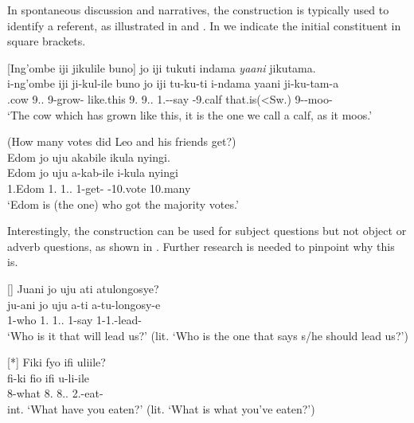 \documentclass[output=paper]{langscibook}
\begin{document}
In spontaneous discussion and narratives, the construction is typically used to identify a referent, as illustrated in  and . In  we indicate the initial constituent in square brackets.

\ea
\label{bkm:Ref123833612}
[Ing’ombe iji jikulile buno] jo iji tukuti indama \textit{yaani} jikutama.\\
\gll
i-ng’ombe  iji  ji-kul-ile  buno  jo  iji  tu-ku-ti i-ndama  yaani  ji-ku-tam-a\\
.cow  9.\DEM.\PROX{}  9\SM{}-grow-\PFV{}  like.this  9.\PRO{}  9.\DEM.\PROX{}  1\PL.\SM-\PRS{}-say \AUG{}-9.calf  that.is(<Sw.)  9\SM-\PRS{}-moo-\FV{}\\
\glt ‘The cow which has grown like this, it is the one we call a calf, as it moos.’

\ex
\label{bkm:Ref123834425}
(How many votes did Leo and his friends get?)\\
Edom jo uju akabile ikula nyingi.\\
\gll
Edom  jo  uju  a-kab-ile  i-kula  nyingi\\
1.Edom  1.\IDCOP{}  1.\DEM.\PROX{}  1\SM{}-get-\PFV{}  \AUG{}-10.vote  10.many\\
\glt
‘Edom is (the one) who got the majority votes.’\\

\z


Interestingly, the construction can be used for subject questions but not object or adverb questions, as shown in . Further research is needed to pinpoint why this is.\largerpage[2]

\ea
[]{
\label{bkm:Ref122708498}
Juani jo uju ati atulongosye?\\
\gll
ju-ani  jo  uju  a-ti  a-tu-longosy-e\\
1-who  1.\IDCOP{}  1.\DEM.\PROX{}  1\SM{}-say  1\SM{}-1\PL.\OM{}-lead-\SBJV{}\\
\glt
‘Who is it that will lead us?’ (lit. ‘Who is the one that says s/he should lead us?’)\\
}

\z

\ea
[*]{
Fiki fyo ifi uliile?\\
\gll
fi-ki  fio  ifi  u-li-ile\\
8-what  8.\IDCOP{}  8.\DEM.\PROX{}  2\SG.\SM{}-eat-\PFV{}\\
\glt
int. ‘What have you eaten?’ (lit. ‘What is what you’ve eaten?’)\\
}
\end{document}
